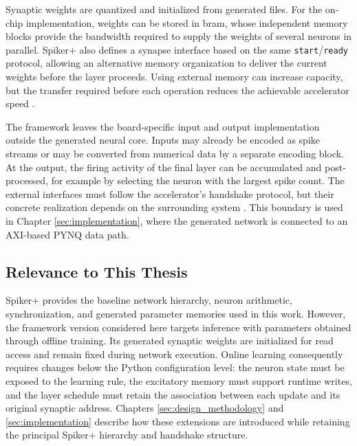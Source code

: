 Synaptic weights are quantized and initialized from generated files. For the on-chip implementation, weights can be stored in \gls{bram}, whose independent memory blocks provide the bandwidth required to supply the weights of several neurons in parallel. Spiker+ also defines a synapse interface based on the same \texttt{start}/\texttt{ready} protocol, allowing an alternative memory organization to deliver the current weights before the layer proceeds. Using external memory can increase capacity, but the transfer required before each operation reduces the achievable accelerator speed \cite{Carpegna2025}.

The framework leaves the board-specific input and output implementation outside the generated neural core. Inputs may already be encoded as spike streams or may be converted from numerical data by a separate encoding block. At the output, the firing activity of the final layer can be accumulated and post-processed, for example by selecting the neuron with the largest spike count. The external interfaces must follow the accelerator's handshake protocol, but their concrete realization depends on the surrounding system \cite{Carpegna2025}. This boundary is used in Chapter \ref{sec:implementation}, where the generated network is connected to an AXI-based PYNQ data path.

\subsection{Relevance to This Thesis}

Spiker+ provides the baseline network hierarchy, neuron arithmetic, synchronization, and generated parameter memories used in this work. However, the framework version considered here targets inference with parameters obtained through offline training. Its generated synaptic weights are initialized for read access and remain fixed during network execution. Online learning consequently requires changes below the Python configuration level: the neuron state must be exposed to the learning rule, the excitatory memory must support runtime writes, and the layer schedule must retain the association between each update and its original synaptic address. Chapters \ref{sec:design_methodology} and \ref{sec:implementation} describe how these extensions are introduced while retaining the principal Spiker+ hierarchy and handshake structure.
